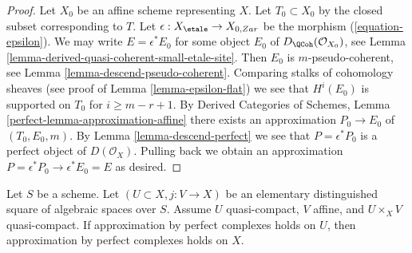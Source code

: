 \begin{proof}
Let $X_0$ be an affine scheme representing $X$. Let $T_0 \subset X_0$
by the closed subset corresponding to $T$. Let
$\epsilon : X_\etale \to X_{0, Zar}$ be the morphism
(\ref{equation-epsilon}). We may write $E = \epsilon^*E_0$ for some object
$E_0$ of $D_\QCoh(\mathcal{O}_{X_0})$, see
Lemma \ref{lemma-derived-quasi-coherent-small-etale-site}.
Then $E_0$ is $m$-pseudo-coherent, see
Lemma \ref{lemma-descend-pseudo-coherent}.
Comparing stalks of cohomology sheaves (see proof of
Lemma \ref{lemma-epsilon-flat})
we see that $H^i(E_0)$ is supported on $T_0$ for $i \geq m - r + 1$. By
Derived Categories of Schemes, Lemma \ref{perfect-lemma-approximation-affine}
there exists an approximation $P_0 \to E_0$ of
$(T_0, E_0, m)$. By Lemma \ref{lemma-descend-perfect}
we see that $P = \epsilon^*P_0$ is a perfect object of $D(\mathcal{O}_X)$.
Pulling back we obtain an approximation
$P = \epsilon^*P_0 \to \epsilon^*E_0 = E$ as desired.
\end{proof}

\begin{lemma}
\label{lemma-induction-step}
Let $S$ be a scheme. Let $(U \subset X, j : V \to X)$ be an
elementary distinguished square of algebraic spaces over $S$.
Assume $U$ quasi-compact, $V$ affine, and $U \times_X V$ quasi-compact.
If approximation by perfect complexes holds on $U$,
then approximation by perfect complexes holds on $X$.
\end{lemma}

